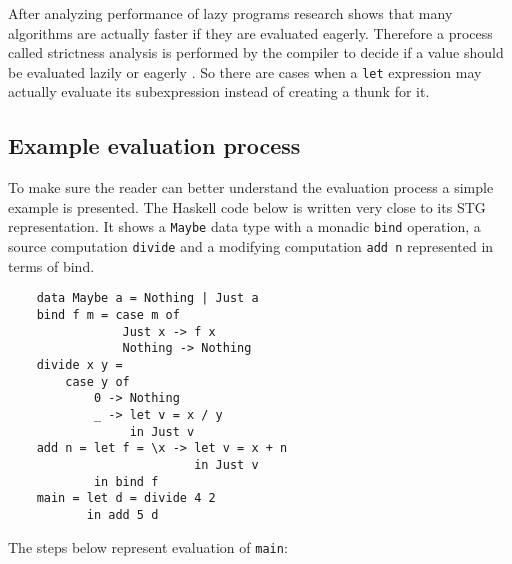\documentclass[en]{pracamgr}
\begin{document}
After analyzing performance of lazy programs research shows that
many algorithms are actually faster if they are evaluated eagerly.
Therefore a process called strictness analysis is
performed by the compiler to decide if a value should be
evaluated lazily or eagerly \cite{demand analysis}.
So there are cases when a \texttt{let} expression may actually evaluate its subexpression instead of creating a thunk for it.

\subsection{Example evaluation process}\label{s:example_eval}

To make sure the reader can better understand the
evaluation process a simple example is presented.
The Haskell code below is written very close to its STG representation.
It shows a \texttt{Maybe} data type with a monadic \texttt{bind} operation,
a source computation \texttt{divide} and a modifying
computation \texttt{add n} represented in terms of bind.

\begin{verbatim}
    data Maybe a = Nothing | Just a
    bind f m = case m of
                Just x -> f x
                Nothing -> Nothing
    divide x y =
        case y of
            0 -> Nothing
            _ -> let v = x / y
                 in Just v
    add n = let f = \x -> let v = x + n 
                          in Just v
            in bind f
    main = let d = divide 4 2
           in add 5 d
\end{verbatim}

The steps below represent evaluation of \texttt{main}:
\end{document}
